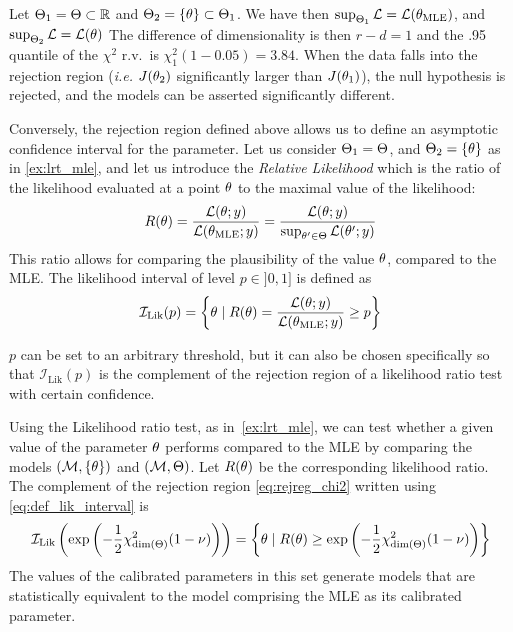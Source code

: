 \documentclass[../../Main_ManuscritThese.tex]{subfiles}
\begin{document}
\begin{example}
  \label{ex:lrt_mle}
  Let $\Theta_1 = \Theta\subset \mathbb{R}$ and $\Theta_2 = \{\theta\}\subset \Theta_1$.
  We have then $\sup_{\Theta_1} \mathcal{L} = \mathcal{L}({\theta}_{\mathrm{MLE}})$, and $\sup_{\Theta_2} \mathcal{L} = \mathcal{L}(\theta)$
 The difference of dimensionality is then $r-d=1$ and the .95 quantile of the $\chi^2$ r.v.\ is $\chi^2_1(1-0.05) =3.84$. When the data falls into the rejection region (\emph{i.e.} $J(\theta_2)$ significantly larger than $J({\theta}_1)$), the null hypothesis is rejected, and the models can be asserted significantly different. 
\end{example}



\label{sec:relative_likelihood}
Conversely, the rejection region defined above allows us to define an asymptotic confidence interval for the parameter. Let us consider $\Theta_1 = \Theta$, and $\Theta_2 = \{\theta\}$ as in \cref{ex:lrt_mle}, and let us introduce the \emph{Relative Likelihood} \citep{kalbfleisch_probability_1985} which is the ratio of the likelihood evaluated at a point $\theta$ to the maximal value of the likelihood:
\begin{equation}
  R(\theta) = \frac{\mathcal{L}(\theta;y)}{\mathcal{L}({\theta}_{\mathrm{MLE}};y)} = \frac{\mathcal{L}(\theta;y)}{\sup_{\theta^{\prime} \in \Theta}\mathcal{L}(\theta^{\prime};y)}
\end{equation}
This ratio allows for comparing the plausibility of the value $\theta$, compared to the MLE.
The likelihood interval of level $p\in ]0,1]$ is defined as
\begin{equation}
  \label{eq:def_lik_interval}
  \mathcal{I}_{\mathrm{Lik}}(p) = \left\{\theta \mid R(\theta)=\frac{\mathcal{L}(\theta;y)}{\mathcal{L}({\theta}_{\mathrm{MLE}};y)} \geq p\right\}
\end{equation}

$p$ can be set to an arbitrary threshold, but it can also be chosen specifically so that $\mathcal{I}_{\mathrm{Lik}}(p)$ is the complement of the rejection region of a likelihood ratio test with certain confidence.

Using the Likelihood ratio test, as in~\cref{ex:lrt_mle}, we can test whether a given value of the parameter $\theta$ performs compared to the MLE by comparing the models $(\mathcal{M}, \{\theta\})$ and $(\mathcal{M},\Theta)$. Let $R(\theta)$ be the corresponding likelihood ratio. The complement of the rejection region \cref{eq:rejreg_chi2} written using \cref{eq:def_lik_interval} is
\begin{equation}
  \label{eq:rel_lik_threshold}
  \mathcal{I}_{\mathrm{Lik}}\left(\exp\left(-\frac{1}{2}\chi^2_{\mathrm{dim}(\Theta)}(1-\nu)\right)\right) = \left\{\theta \mid R(\theta) \geq \exp\left(-\frac{1}{2}\chi^2_{\mathrm{dim}(\Theta)}(1-\nu)\right) \right\}
\end{equation}
The values of the calibrated parameters in this set generate models that are statistically equivalent to the model comprising the MLE as its calibrated parameter.
\end{document}
